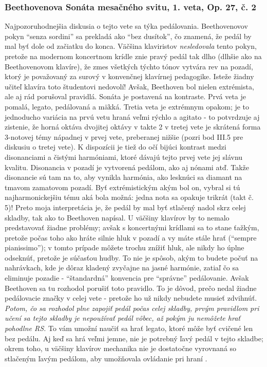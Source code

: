 \subsubsection{Beethovenova Sonáta mesačného svitu, 1. veta, Op. 27, č. 2}
Najpozoruhodnejšia diskusia o tejto vete sa týka pedálovania. Beethovenovov pokyn “senza sordini” sa prekladá ako “bez dusítok”, čo znamená, že pedál by mal byť dole od začiatku do konca. Väčšina klaviristov \textit{nesledovala} tento pokyn, pretože na modernom koncertnom krídle znie pravý pedál tak dlho (dlhšie ako na Beethovenovom klavíre), že zmes všetkých týchto tónov vytvára rev na pozadí, ktorý je považovaný za surový v konvenčnej klavírnej pedagogike. Isteže žiadny učiteľ klavíra toto študentovi nedovolí! Avšak, Beethoven bol nielen extrémista, ale aj rád porušoval pravidlá. Sonáta je postavená na kontraste. Prvá veta je pomalá, legato, pedálovaná a mäkká. Tretia veta je extrémnym opakom; je to jednoducho variácia na prvú vetu hraná veľmi rýchlo a agitato - to potvrdzuje aj zistenie, že horná oktáva dvojitej oktávy v takte 2 v tretej vete je skrátená forma 3-notovej témy nápadnej v prvej vete, preberanej nižšie (pozri bod III.5 pre diskusiu o tretej vete). K dispozícii je tiež do očí bijúci kontrast medzi disonanciami a čistými harmóniami, ktoré dávajú tejto prvej vete jej slávnu kvalitu. Disonancia v pozadí je vytvorená pedálom, ako aj nónami atď. Takže disonancie sú tam na to, aby vynikla harmónia, ako lesknúci sa diamant na tmavom zamatovom pozadí. Byť extrémistickým akým bol on, vybral si tú najharmonickejšiu tému aká bola možná: jedna nota sa opakuje trikrát (takt č. 5)! Preto moja interpretácia je, že pedál by mal byť stlačený nadol skrz celej skladby, tak ako to Beethoven napísal. U väčšiny klavírov by to nemalo predstavovať žiadne problémy; avšak s koncertnými krídlami sa to stane ťažkým, pretože počas toho ako hráte silnie hluk v pozadí a vy máte stále hrať  (“sempre pianissimo”); v tomto prípade môžete trochu znížiť hluk, ale nikdy ho úplne odseknúť, pretože je súčasťou hudby. To nie je spôsob, akým to budete počuť na nahrávkach, kde je dôraz kladený zvyčajne na jasné harmónie, zatiaľ čo sa eliminuje pozadie - “štandardná” konvencia pre “správne” pedálovanie. Avšak Beethoven sa tu rozhodol porušiť toto pravidlo. To je dôvod, prečo nedal žiadne pedálovacie značky v celej vete - pretože ho už nikdy nebudete musieť zdvihnúť. \emph{Potom, čo sa rozhodol plne zapojiť pedál počas celej skladby, prvým pravidlom pri učení sa tejto skladby je nepoužívať pedál vôbec, až pokým ju nemôžete hrať pohodlne RS.} To vám umožní naučiť sa hrať legato, ktoré môže byť cvičené len bez pedálu. Aj keď sa hrá veľmi jemne, nie je potrebný ľavý pedál v tejto skladbe; okrem toho, u väčšiny klavírov mechanika nie je dostatočne vyrovnaná so stlačeným ľavým pedálom, aby umožňovala ovládanie pri hraní .

